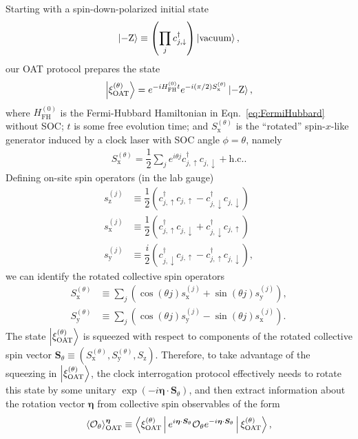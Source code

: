 \documentclass[aps,prx,superscriptaddress,notitlepage,twocolumn,longbibliography]{revtex4-2}
\renewcommand{\t}{\text} %
\newcommand{\f}[2]{\dfrac{#1}{#2}} %
\newcommand{\p}[1]{\left(#1\right)} %
\renewcommand{\c}{\cdot} %
\renewcommand{\v}{\bm} %
\newcommand{\bk}{\Braket}
\renewcommand{\ket}{\Ket}
\renewcommand{\O}{\mathcal{O}}
\newcommand{\z}{\text{z}}
\newcommand{\x}{\text{x}}
\newcommand{\y}{\text{y}}
\newcommand{\up}{\uparrow}
\newcommand{\dn}{\downarrow}
\begin{document}
Starting with a spin-down-polarized initial state
\begin{align}
  \ket{-\t{Z}}\equiv\p{\prod_j c_{j,\dn}^\dag}\ket{\t{vacuum}},
\end{align}
our OAT protocol prepares the state
\begin{align}
  \ket{\xi_{\t{OAT}}^{(\theta)}} = e^{-i H_{\t{FH}}^{(0)}t}
  e^{-i\p{\pi/2}S_\x^{(\theta)}} \ket{-\t{Z}},
\end{align}
where $H_{\t{FH}}^{(0)}$ is the Fermi-Hubbard Hamiltonian in Eqn.~\eqref{eq:FermiHubbard} without SOC; $t$ is some free evolution time; and $S_\x^{(\theta)}$ is the ``rotated'' spin-$x$-like generator induced by a clock laser with SOC angle $\phi=\theta$, namely
\begin{align}
  S_\x^{(\theta)}
  = \f12 \sum_j e^{i\theta j} c_{j,\up}^\dag c_{j,\dn} + \t{h.c.}.
\end{align}
Defining on-site spin operators (in the lab gauge)
\begin{align}
  s_\z^{(j)} &\equiv \f12 \p{ c_{j,\up}^\dag c_{j,\up}
    - c_{j,\dn}^\dag c_{j,\dn}} \\
  s_\x^{(j)} &\equiv \f12 \p{c_{j,\up}^\dag c_{j,\dn}
    + c_{j,\dn}^\dag c_{j,\up}} \\
  s_\y^{(j)} &\equiv \f{i}{2} \p{c_{j,\dn}^\dag c_{j,\up}
    - c_{j,\up}^\dag c_{j,\dn}},
\end{align}
we can identify the rotated collective spin operators
\begin{align}
  S_\x^{(\theta)} &\equiv \sum_j \p{\cos\p{\theta j} s_\x^{(j)}
  + \sin\p{\theta j} s_\y^{(j)}},
  \label{eq:S_x_theta} \\
  S_\y^{(\theta)} &\equiv \sum_j \p{\cos\p{\theta j} s_\y^{(j)}
  - \sin\p{\theta j} s_\x^{(j)}}.
  \label{eq:S_y_theta}
\end{align}
The state $\ket{\xi_{\t{OAT}}^{(\theta)}}$ is squeezed with respect to components of the rotated collective spin vector $\v S_\theta \equiv \p{S_\x^{(\theta)},S_\y^{(\theta)},S_\z}$.
Therefore, to take advantage of the squeezing in $\ket{\xi_{\t{OAT}}^{(\theta)}}$, the clock interrogation protocol effectively needs to rotate this state by some unitary $\exp\p{-i\v\eta\c\v S_\theta}$, and then extract information about the rotation vector $\v\eta$ from collective spin observables of the form
\begin{align}
  \bk{\O_\theta}_{\t{OAT}}^{\v\eta}
  \equiv \bk{\xi_{\t{OAT}}^{(\theta)}| e^{i\v\eta\c\v S_\theta}
    \O_\theta e^{-i\v\eta\c\v S_\theta} |\xi_{\t{OAT}}^{(\theta)}},
\end{align}
\end{document}
